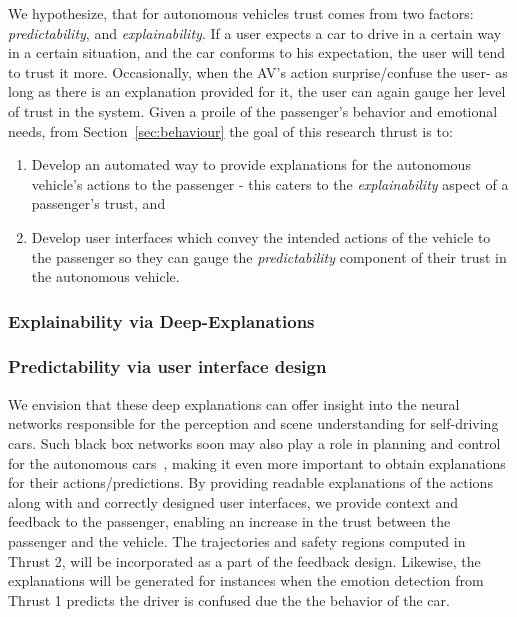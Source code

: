 We hypothesize, that for autonomous vehicles trust comes from two factors: \textit{predictability}, and \textit{explainability}.
If a user expects a car to drive in a certain way in a certain situation, and the car conforms to his expectation, the user will tend to trust it more.
Occasionally, when the AV’s action surprise/confuse the user- as long as there is an explanation provided for it, the user can again gauge her level of trust in the system.
Given a proile of the passenger's behavior and emotional needs, from Section~\ref{sec:behaviour} the goal of this research thrust is to:
\begin{enumerate}[itemsep=0pt,parsep=0pt,topsep=4pt,leftmargin=0.4in]
    \item Develop an automated way to provide explanations for the autonomous vehicle's actions to the passenger - this caters to the \textit{explainability} aspect of a passenger's trust, and
    \item Develop user interfaces which convey the intended actions of the vehicle to the passenger so they can gauge the \textit{predictability} component of their trust in the autonomous vehicle.
\end{enumerate}





\subsubsection{Explainability via Deep-Explanations }
\label{subsec:explainability}


\subsubsection{Predictability via user interface design}
\label{subsec:uid}


We envision that these deep explanations can offer insight into the neural networks responsible for the perception and scene understanding for self-driving cars. Such black box networks soon may also play a role in planning and control for the autonomous cars~\cite{bojarski2016end}, making it even more important to obtain explanations for their actions/predictions.
By providing readable explanations of the actions along with and correctly designed user interfaces, we provide context and feedback to the passenger, enabling an increase in the trust between the passenger and the vehicle.
The trajectories and safety regions computed in Thrust 2, will be incorporated as a part of the feedback design. 
Likewise, the explanations will be generated for instances when the emotion detection from Thrust 1 predicts the driver is confused due the the behavior of the car. 